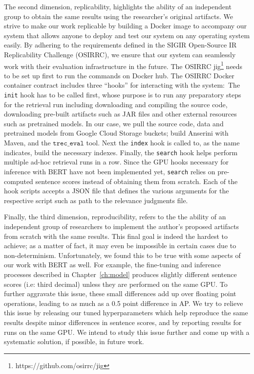 The second dimension, replicability, highlights the ability of an independent group to obtain the same results using the researcher's original artifacts.
We strive to make our work replicable by building a Docker image to accompany our system that allows anyone to deploy and test our system on any operating system easily.
By adhering to the requirements defined in the SIGIR Open-Source IR Replicability Challenge (OSIRRC), we ensure that our system can seamlessly work with their evaluation infrastructure in the future.
The OSIRRC jig\footnote{https://github.com/osirrc/jig} needs to be set up first to run the commands on Docker hub.
The OSIRRC Docker container contract includes three ``hooks'' for interacting with the system:\
The \texttt{init} hook has to be called first, whose purpose is to run any preparatory steps for the retrieval run including downloading and compiling the source code, downloading pre-built artifacts such as JAR files and other external resources such as pretrained models.
In our case, we pull the source code, data and pretrained models from Google Cloud Storage buckets; build Anserini with Maven, and the $\texttt{trec\_eval}$ tool.
Next the \texttt{index} hook is called to, as the name indicates, build the necessary indexes.
Finally, the \texttt{search} hook helps perform multiple ad-hoc retrieval runs in a row.
Since the GPU hooks necessary for inference with BERT have not been implemented yet, \texttt{search} relies on pre-computed sentence scores instead of obtaining them from scratch.
Each of the hook scripts accepts a JSON file that defines the various arguments for the respective script such as path to the relevance judgments file.

Finally, the third dimension, reproducibility, refers to the the ability of an independent group of researchers to implement the author's proposed artifacts from scratch with the same results.
This final goal is indeed the hardest to achieve; as a matter of fact, it may even be impossible in certain cases due to non-determinism.
Unfortunately, we found this to be true with some aspects of our work with BERT as well.
For example, the fine-tuning and inference processes described in Chapter~\ref{ch:model} produces slightly different sentence scores (i.e: third decimal) unless they are performed on the same GPU.
To further aggravate this issue, these small differences add up over floating point operations, leading to as much as a 0.5 point difference in AP.
We try to relieve this issue by releasing our tuned hyperparameters which help reproduce the same results despite minor differences in sentence scores, and by reporting results for runs on the same GPU.
We intend to study this issue further and come up with a systematic solution, if possible, in future work.

